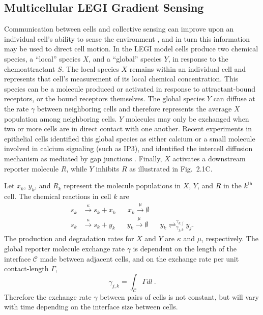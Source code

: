 \subsection{Multicellular LEGI Gradient Sensing}

Communication between cells and collective sensing can improve upon an individual cell's ability to sense the environment \cite{ellison2016cell}, and in turn this information may be used to direct cell motion.
In the LEGI model cells produce two chemical species, a ``local'' species $X$, and a ``global'' species $Y$, in response to the chemoattractant $S$. The local species $X$ remains within an individual cell and represents that cell's measurement of its local chemical concentration. This species can be a molecule produced or activated in response to attractant-bound receptors, or the bound receptors themselves. The global species $Y$ can diffuse at the rate $\gamma$ between neighboring cells and therefore represents the average $X$ population among neighboring cells. $Y$ molecules may only be exchanged when two or more cells are in direct contact with one another. Recent experiments in epithelial cells identified this global species as either calcium or a small molecule involved in calcium signaling (such as IP3), and identified the intercell diffusion mechanism as mediated by gap junctions \cite{ellison2016cell}.
Finally, $X$ activates a downstream reporter molecule $R$, while $Y$ inhibits $R$ as illustrated in Fig.\ 2.1C.

Let $x_k$, $y_k$, and $R_k$ represent the molecule populations in $X$, $Y$, and $R$ in the $k^\text{th}$ cell. The chemical reactions in cell $k$ are
\begin{equation}
    \begin{aligned}
        s_k &\xrightarrow{\kappa} s_k + x_k \hspace{20pt} x_k \xrightarrow{\mu} \emptyset \\
        s_k &\xrightarrow{\kappa} s_k + y_k \hspace{20pt} y_k \xrightarrow{\mu} \emptyset \hspace{20pt} y_k \rightleftharpoons_{\gamma_{j,k}}^{\gamma_{k,j}} y_{j} .
    \end{aligned}
\end{equation}
The production and degradation rates for $X$ and $Y$ are $\kappa$ and $\mu$, respectively. The global reporter molecule exchange rate $\gamma$ is dependent on the length of the interface $\mathcal{C}$ made between adjacent cells, and on the exchange rate per unit contact-length $\Gamma$,
\begin{equation}
    \gamma_{j,k} = \int_{\mathcal{C}} \Gamma dl \ .
\end{equation}
Therefore the exchange rate $\gamma$ between pairs of cells is not constant, but will vary with time depending on the interface size between cells.

